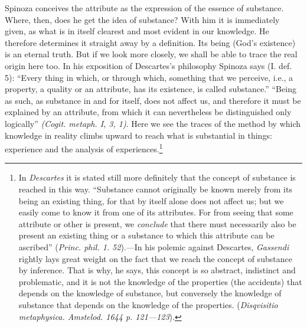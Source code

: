 \documentclass[12pt]{book}
\newcommand{\opage}[1]{\marginnote{\footnotesize\textit{[#1]}}}
\begin{document}
Spinoza conceives the attribute as the expression of the essence of substance. Where,
then, does he get the idea of substance? With him it is immediately given, as what is in
itself clearest and most evident in our knowledge. He therefore determines it straight
away by a definition. Its being (God's existence) is an eternal truth. But if we look
more closely, we shall be able to trace the real origin here too. In his exposition of
Descartes's philosophy Spinoza says (I. def. 5): ``Every thing in which, or through
which, something that we perceive, i.e., a property, a quality or an attribute, has its
existence, is called substance.'' ``Being as such, as substance in and for itself, does
not affect us, and therefore it must be explained by an attribute, from which it can
nevertheless be distinguished only logically'' \textit{(Cogit. metaph. I, 3, 1)}. Here
we see the traces of the method by which knowledge \opage{77}in reality climbs upward
to reach what is substantial in things: experience and the analysis of
experiences.\footnote{In \emph{Descartes} it is stated still more definitely that the
concept of substance is reached in this way. ``Substance cannot originally be known
merely from its being an existing thing, for that by itself alone does not affect us;
but we easily come to know it from one of its attributes. For from seeing that some
attribute or other is present, we \emph{conclude} that there must necessarily also be
present an existing thing or a substance to which this attribute can be ascribed''
(\textit{Princ. phil. 1. 52}).---In his polemic against Descartes, \emph{Gassendi}
rightly lays great weight on the fact that we reach the concept of substance by
inference. That is why, he says, this concept is so abstract, indistinct and
problematic, and it is not the knowledge of the properties (the accidents) that depends
on the knowledge of substance, but conversely the knowledge of substance that depends
on the knowledge of the properties. (\textit{Disqvisitio metaphysica. Amstelod. 1644
p. 121---123}).}
\end{document}
